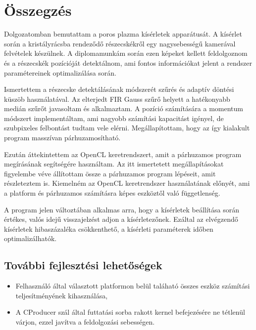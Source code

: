 \chapter{Összegzés}
	Dolgozatomban bemutattam a poros plazma kísérletek apparátusát. A kísérlet során a kristályrácsba
	rendeződő részecskékről egy nagysebességű kamerával felvételek készülnek. A diplomamunkám során ezen
	képeket kellett feldolgoznom és a részecskék pozícióját detektálnom, ami fontos információkat jelent a rendszer paramétereinek
	optimalizálása során.

	Ismertettem a részecske detektálásának módszerét szűrés és adaptív döntési küszöb használatával.
	Az elterjedt FIR Gauss szűrő helyett a hatékonyabb medián szűrőt javasoltam és alkalmaztam. A
	pozíció számítására a momentum módszert implementáltam, ami nagyobb számítási kapacitást igényel, de
	szubpixeles felbontást tudtam vele elérni. Megállapítottam, hogy az így kialakult program masszívan párhuzamosítható.
	
	Ezután áttekintettem az OpenCL keretrendszert, amit a párhuzamos program megírásának segítségére
	használtam. Az itt ismertetett megállapításokat figyelembe véve állítottam össze a párhuzamos
	program lépéseit, amit részleteztem is. Kiemelném az OpenCL keretrendszer használatának előnyét, ami a platform és párhuzamos
	számításra képes eszköztől való függetlenség.
	
	A program jelen változtában alkalmas arra, hogy a kísérletek
        beállítása során értékes, valós idejű visszajelzést adjon a
        kísérletezőnek. Ezáltal az elvégzendő kísérletek hibaszázaléka
        csökkenthető, a kísérleti paraméterek időben optimalizálhatók.
	
	\section*{További fejlesztési lehetőségek}
	\begin{itemize}
		\item Felhasználó által választott platformon belül taláható összes eszköz számítási teljesítményének kihasználása,
		\item A CProducer szál által futtatási sorba rakott kernel befejezésére ne tétlenül várjon, ezzel javítva a feldolgozási
		sebességen.
	\end{itemize}
